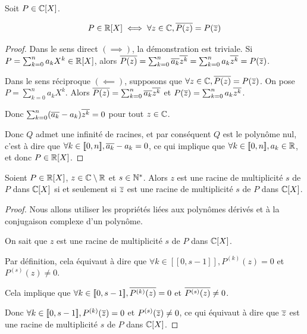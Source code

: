 \documentclass[12pt, a4paper]{report}
\begin{document}
\begin{property}
    Soit $P \in \mathbb{C}[X]$.

    $$P \in \mathbb{R}[X] \iff \forall z \in \mathbb{C}, \overline{P(z)} = P(\overline{z})$$
\end{property}

\begin{proof}
    Dans le sens direct $(\implies)$, la démonstration est triviale. Si $P = \sum_{k=0}^{n}a_kX^k \in \mathbb{R}[X]$, alors $\overline{P(z)} = \sum_{k=0}^{n}\overline{a_k}\overline{z^k} = \sum_{k=0}^{n}a_k\overline{z^k} = P(\overline{z})$.

    Dans le sens réciproque $(\impliedby)$, supposons que $\forall z \in \mathbb{C}, \overline{P(z)} = P(\overline{z})$. On pose $P = \sum_{k=0}^{n}a_kX^k$. Alors $\overline{P(z)} = \sum_{k=0}^{n}\overline{a_k}\overline{z^k}$ et $P(\overline{z}) = \sum_{k=0}^{n}a_k\overline{z^k}$.

    Donc $\sum_{k=0}^{n}(\overline{a_k} - a_k)\overline{z^k} = 0$ pour tout $z \in \mathbb{C}$.

    Donc $Q$ admet une infinité de racines, et par conséquent $Q$ est le polynôme nul, c'est à dire que $\forall k \in [\![0,n]\!], \overline{a_k} - a_k = 0$, ce qui implique que $\forall k \in [\![0,n]\!], a_k \in \mathbb{R}$, et donc $P \in \mathbb{R}[X]$.
\end{proof}

\begin{consequence}
    Soient $P \in \mathbb{R}[X]$, $z \in \mathbb{C}\setminus\mathbb{R}$ et $s \in \mathbb{N}^*$. Alors $z$ est une racine de multiplicité $s$ de $P$ dans $\mathbb{C}[X]$ si et seulement si $\overline{z}$ est une racine de multiplicité $s$ de $P$ dans $\mathbb{C}[X]$.
\end{consequence}

\begin{proof}
    Nous allons utiliser les propriétés liées aux polynômes dérivés et à la conjugaison complexe d'un polynôme.

    On sait que $z$ est une racine de multiplicité $s$ de $P$ dans $\mathbb{C}[X]$.

    Par définition, cela équivaut à dire que $\forall k \in [\![0,s-1]\!], P^{(k)}(z) = 0$ et $P^{(s)}(z) \ne 0$.

    Cela implique que $\forall k \in [\![0,s-1]\!], \overline{P^{(k)}(z)} = 0$ et $\overline{P^{(s)}(z)} \ne 0$.

    Donc $\forall k \in [\![0,s-1]\!], P^{(k)}(\overline{z}) = 0$ et $P^{(s)}(\overline{z}) \ne 0$, ce qui équivaut à dire que $\overline{z}$ est une racine de multiplicité $s$ de $P$ dans $\mathbb{C}[X]$.
\end{proof}
\end{document}
